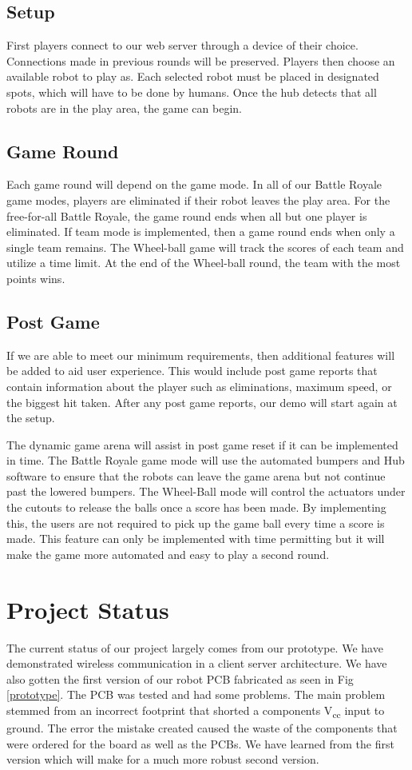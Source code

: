 \documentclass[11pt]{ieeeconf}
\begin{document}
\subsection{Setup}
First players connect to our web server through a device of their choice. Connections made in previous rounds will be preserved. Players then choose an available robot to play as. Each selected robot must be placed in designated spots, which will have to be done by humans. Once the hub detects that all robots are in the play area, the game can begin. 

\subsection{Game Round}
Each game round will depend on the game mode. In all of our Battle Royale game modes, players are eliminated if their robot leaves the play area. For the free-for-all Battle Royale, the game round ends when all but one player is eliminated. If team mode is implemented, then a game round ends when only a single team remains. The Wheel-ball game will track the scores of each team and utilize a time limit. At the end of the Wheel-ball round, the team with the most points wins.  

\subsection{Post Game}
If we are able to meet our minimum requirements, then additional features will be added to aid user experience. This would include post game reports that contain information about the player such as eliminations, maximum speed, or the biggest hit taken. After any post game reports, our demo will start again at the setup.

The dynamic game arena will assist in post game reset if it can be implemented in time. The Battle Royale game mode will use the automated bumpers and Hub software to ensure that the robots can leave the game arena but not continue past the lowered bumpers. The Wheel-Ball mode will control the actuators under the cutouts to release the balls once a score has been made. By implementing this, the users are not required to pick up the game ball every time a score is made. This feature can only be implemented with time permitting but it will make the game more automated and easy to play a second round. 

\section{Project Status}
The current status of our project largely comes from our prototype. We have demonstrated wireless communication in a client server architecture. We have also gotten the first version of our robot PCB fabricated as seen in Fig \ref{prototype}. The PCB was tested and had some problems. The main problem stemmed from an incorrect footprint that shorted a components V\textsubscript{cc} input to ground. The error the mistake created caused the waste of the components that were ordered for the board as well as the PCBs. We have learned from the first version which will make for a much more robust second version.
\end{document}
